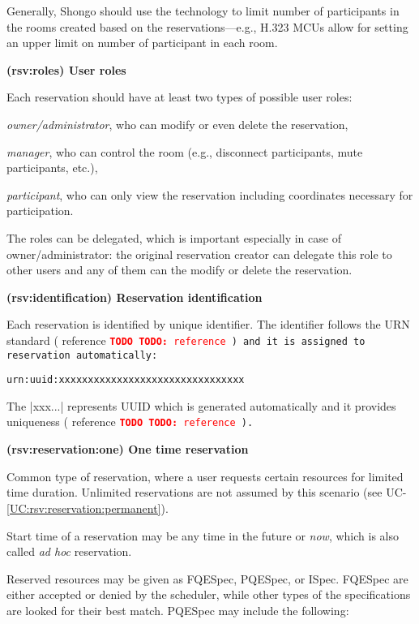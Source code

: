 \documentclass[a4paper]{report}
\makeatletter
\newcounter{UCcounter}
\newenvironment{UseCases}%
	{\begin{list}{\textbf{UC-\arabic{UCcounter}}}{\@nmbrlisttrue\def\@listctr{UCcounter}}}%
	{\end{list}}
\newcommand{\UClabel}[1]{\label{UC:#1}}
\newcommand{\UCref}[1]{UC-\ref{UC:#1}}
\newcommand{\UseCase}[2]{\item\UClabel{#2} \textbf{(#2) #1}\\ \nopagebreak}
\newcommand{\TODO}[1]{%
\def\empty{}%
\def\prvniparametr{#1}%
\ifx\prvniparametr\empty%
\begingroup\tt\textcolor{red}{\noindent\textbf{TODO}}\endgroup
\else%
\begingroup\tt\textcolor{red}{\noindent\textbf{TODO:}\ #1}\endgroup
\fi%
}
\makeatother
\begin{document}
\begin{UseCases}
Generally, Shongo should use the technology to limit number of participants in
the rooms created based on the reservations---e.g., H.323 MCUs allow for
setting an upper limit on number of participant in each room.

\UseCase{User roles}{rsv:roles}

Each reservation should have at least two types of possible user roles:

\begin{compactitem}

\item \emph{owner/administrator}, who can modify or even delete the reservation,

\item \emph{manager}, who can control the room (e.g., disconnect participants, mute participants, etc.),

\item \emph{participant}, who can only view the reservation including coordinates necessary for participation.

\end{compactitem}

The roles can be delegated, which is important especially in case of owner/administrator: the original reservation creator can delegate this role to other users and any of them can the modify or delete the reservation.


\UseCase{Reservation identification}{rsv:identification}

Each reservation is identified by unique identifier. The identifier follows the URN standard (\TODO{reference}) and it is assigned to reservation automatically:
\begin{verbatim}
urn:uuid:xxxxxxxxxxxxxxxxxxxxxxxxxxxxxxxx
\end{verbatim}
The |xxx...| represents UUID which is generated automatically and it provides uniqueness (\TODO{reference}).


\UseCase{One time reservation}{rsv:reservation:one}

Common type of reservation, where a user requests certain resources for limited
time duration. Unlimited reservations are not assumed by this scenario (see
\UCref{rsv:reservation:permanent}).

Start time of a reservation may be any time in the future or \emph{now}, which
is also called \emph{ad hoc} reservation.

Reserved resources may be given as FQESpec, PQESpec, or ISpec. FQESpec are
either accepted or denied by the scheduler, while other types of the
specifications are looked for their best match. PQESpec may include the
following:


\end{UseCases}
\end{document}
